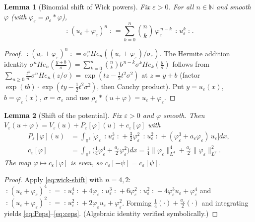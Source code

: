 \documentclass[12pt]{article}
\newcommand{\bT}{\mathbb{T}}
\newcommand{\bN}{\mathbb{N}}
\newcommand{\eps}{\varepsilon}
\newcommand{\Wick}[1]{\mathopen{:}#1\mathclose{:}}
\theoremstyle{plain}
\newtheorem{lemma}{Lemma}
\theoremstyle{definition}
\begin{document}
\begin{lemma}[Binomial shift of Wick powers]\label{lem:wick-shift}
Fix $\eps>0$. For all $n\in\bN$ and smooth $\varphi$ (with $\varphi_\eps=\rho_\eps*\varphi$),
\begin{equation}\label{eq:wick-shift}
\Wick{(u_\eps+\varphi_\eps)^n}=\sum_{k=0}^n\binom nk\,\varphi_\eps^{\,n-k}\,\Wick{u_\eps^k}.
\end{equation}
\end{lemma}

\begin{proof}
$\Wick{(u_\eps+\varphi_\eps)^n}=\sigma_\eps^n He_n((u_\eps+\varphi_\eps)/\sigma_\eps)$.
The Hermite addition identity
$\sigma^n He_n(\tfrac{y+b}{\sigma})=\sum_{k=0}^n\binom nk b^{\,n-k}\sigma^k He_k(\tfrac y\sigma)$
follows from $\sum_{n\ge0}\frac{t^n}{n!}\sigma^n He_n(z/\sigma)=\exp(tz-\tfrac12 t^2\sigma^2)$
at $z=y+b$ (factor $\exp(tb)\cdot\exp(ty-\tfrac12t^2\sigma^2)$, then Cauchy product).
Put $y=u_\eps(x)$, $b=\varphi_\eps(x)$, $\sigma=\sigma_\eps$ and use
$\rho_\eps*(u+\varphi)=u_\eps+\varphi_\eps$.
\end{proof}

\begin{lemma}[Shift of the potential]\label{lem:V-shift}
Fix $\eps>0$ and $\varphi$ smooth. Then $V_\eps(u+\varphi)=V_\eps(u)+P_\eps[\varphi](u)+c_\eps[\varphi]$
with
\begin{align}
P_\eps[\varphi](u)&=\int_{\bT^3}\Big[\varphi_\eps\,\Wick{u_\eps^3}
+\tfrac32\varphi_\eps^2\,\Wick{u_\eps^2}
+(\varphi_\eps^3+a_\eps\varphi_\eps)\,u_\eps\Big]dx, \label{eq:Peps}\\
c_\eps[\varphi]&=\int_{\bT^3}\Big(\tfrac14\varphi_\eps^4+\tfrac{a_\eps}{2}\varphi_\eps^2\Big)dx
=\tfrac14\|\varphi_\eps\|_{L^4}^4+\tfrac{a_\eps}2\|\varphi_\eps\|_{L^2}^2 .\label{eq:ceps}
\end{align}
The map $\varphi\mapsto c_\eps[\varphi]$ is even, so $c_\eps[-\psi]=c_\eps[\psi]$.
\end{lemma}

\begin{proof}
Apply \eqref{eq:wick-shift} with $n=4,2$:
$\Wick{(u_\eps+\varphi_\eps)^4}=\Wick{u_\eps^4}+4\varphi_\eps\Wick{u_\eps^3}+6\varphi_\eps^2\Wick{u_\eps^2}+4\varphi_\eps^3u_\eps+\varphi_\eps^4$
and $\Wick{(u_\eps+\varphi_\eps)^2}=\Wick{u_\eps^2}+2\varphi_\eps u_\eps+\varphi_\eps^2$.
Forming $\tfrac14(\cdot)+\tfrac{a_\eps}2(\cdot)$ and integrating yields
\eqref{eq:Peps}--\eqref{eq:ceps}. (Algebraic identity verified symbolically.)
\end{proof}
\end{document}
